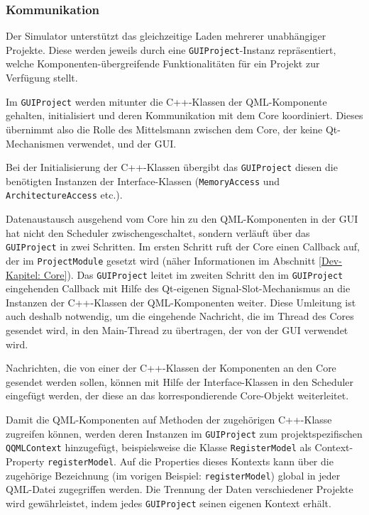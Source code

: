 \subsubsection{Kommunikation}
\label{gui-kommunikation}

Der Simulator unterstützt das gleichzeitige Laden mehrerer unabhängiger
Projekte. Diese werden jeweils durch eine \texttt{GUIProject}-Instanz
repräsentiert, welche Komponenten-über\-grei\-fen\-de Funktionalitäten für ein
Projekt zur Verfügung stellt.

Im \texttt{GUIProject} werden mitunter die C++-Klassen der QML-Komponente
gehalten, initialisiert und deren Kommunikation mit dem Core koordiniert.
Dieses übernimmt also die Rolle des Mittelsmann zwischen dem Core, der keine
Qt-Mechanismen verwendet, und der GUI.

Bei der Initialisierung der C++-Klassen übergibt das \texttt{GUIProject} diesen
die benötigten Instanzen der Interface-Klassen (\texttt{MemoryAccess} und
\texttt{ArchitectureAccess} etc.).

Datenaustausch ausgehend vom Core hin zu den QML-Komponenten in der GUI hat
nicht den Scheduler zwischengeschaltet, sondern verläuft über das
\texttt{GUIProject} in zwei Schritten. Im ersten Schritt ruft der Core einen
Callback auf, der im \texttt{ProjectModule} gesetzt wird (näher Informationen im
Abschnitt \ref{Dev-Kapitel: Core}). Das \texttt{GUIProject} leitet im zweiten Schritt den im
\texttt{GUIProject} eingehenden Callback mit Hilfe des Qt-eigenen
Signal-Slot-Mechanismus an die Instanzen der C++-Klassen der QML-Komponenten
weiter. Diese Umleitung ist auch deshalb notwendig, um die eingehende Nachricht,
die im Thread des Cores gesendet wird, in den Main-Thread zu übertragen, der von
der GUI verwendet wird.

Nachrichten, die von einer der C++-Klassen der Komponenten an den Core gesendet
werden sollen, können mit Hilfe der Interface-Klassen in den Scheduler eingefügt
werden, der diese an das korrespondierende Core-Objekt weiterleitet.

Damit die QML-Komponenten auf Methoden der zugehörigen C++-Klasse zugreifen
können, werden deren Instanzen im \texttt{GUIProject} zum projektspezifischen
\texttt{QQMLContext} hinzugefügt, beispielsweise die Klasse
\texttt{RegisterModel} als Context-Property \texttt{registerModel}. Auf die
Properties dieses Kontexts kann über die zugehörige Bezeichnung (im vorigen Beispiel: 
\texttt{registerModel}) global in jeder QML-Datei zugegriffen werden. Die
Trennung der Daten verschiedener Projekte wird gewährleistet, indem jedes
\texttt{GUIProject} seinen eigenen Kontext erhält.

